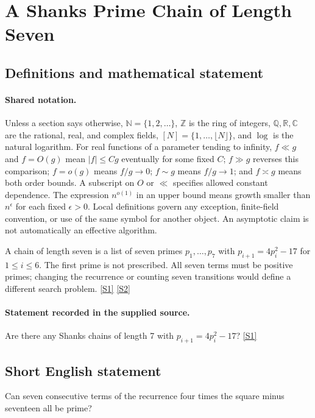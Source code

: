 \documentclass[11pt,a4paper]{article}
\newcommand{\N}{\mathbb{N}}
\newcommand{\Z}{\mathbb{Z}}
\newcommand{\Q}{\mathbb{Q}}
\newcommand{\R}{\mathbb{R}}
\newcommand{\C}{\mathbb{C}}
\newcommand{\sref}[2]{\hyperlink{source:#1:#2}{[S#2]}}
\begin{document}
\section{A Shanks Prime Chain of Length Seven}\label{statement}


\subsection{Definitions and mathematical statement}

\paragraph{Shared notation.}Unless a section says otherwise, $\N=\{1,2,\ldots\}$,
$\Z$ is the ring of integers, $\Q,\R,\C$ are the rational, real, and complex
fields, $[N]=\{1,\ldots,\lfloor N\rfloor\}$, and $\log$ is the natural
logarithm. For real functions of a parameter tending to infinity,
$f\ll g$ and $f=O(g)$ mean $|f|\leq Cg$ eventually for some fixed $C$;
$f\gg g$ reverses this comparison; $f=o(g)$ means $f/g\to0$;
$f\sim g$ means $f/g\to1$; and $f\asymp g$ means both order bounds.
A subscript on $O$ or $\ll$ specifies allowed constant dependence.
The expression $n^{o(1)}$ in an upper bound means growth smaller than
$n^\epsilon$ for each fixed $\epsilon>0$. Local definitions govern any
exception, finite-field convention, or use of the same symbol for another
object. An asymptotic claim is not automatically an effective algorithm.



A chain of length seven is a list of seven primes $p_1,\ldots,p_7$ with $p_{i+1}=4p_i^2-17$ for $1\leq i\leq6$. The first prime is not prescribed. All seven terms must be positive primes; changing the recurrence or counting seven transitions would define a different search problem. \sref{statement}{1} \sref{statement}{2}

\paragraph{Statement recorded in the supplied source.}
Are there any Shanks chains of length 7 with $p_{i+1} = 4p_i^2 - 17$? \sref{statement}{1}

\subsection{Short English statement}

Can seven consecutive terms of the recurrence four times the square minus seventeen all be prime?
\end{document}
